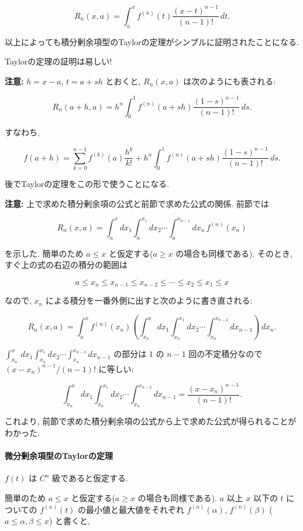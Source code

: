 \documentclass[10pt, a4paper,xelatex,ja=standard]{bxjsarticle}
\begin{document}
\[
R_n(x,a) = \int_a^x f^{(n)}(t)\frac{(x-t)^{n-1}}{(n-1)!}\,dt.
\]

以上によっても積分剰余項型のTaylorの定理がシンプルに証明されたことになる.

Taylorの定理の証明は易しい!

\textbf{注意:} \(h = x - a\), \(t = a + sh\) とおくと, \(R_n(x,a)\)
は次のようにも表される:

\[
R_n(a+h, a) = h^n\int_0^1 f^{(n)}(a + sh)\frac{(1-s)^{n-1}}{(n-1)!}\,ds.
\]

すなわち,

\[
f(a+h) =
\sum_{k=0}^{n-1} f^{(k)}(a)\frac{h^k}{k!} +
h^n\int_0^1 f^{(n)}(a + sh)\frac{(1-s)^{n-1}}{(n-1)!}\,ds.
\]

後でTaylorの定理をこの形で使うことになる.

\textbf{注意:} 上で求めた積分剰余項の公式と前節で求めた公式の関係.
前節では

\[
R_n(x, a) = \int_a^x dx_1\int_a^{x_1}dx_2\cdots\int_a^{x_{n-1}}dx_n\, f^{(n)}(x_n)
\]

を示した. 簡単のため \(a\le x\) と仮定する(\(a \ge x\)
の場合も同様である). そのとき, すぐ上の式の右辺の積分の範囲は

\[
a \le x_n \le x_{n-1}\le x_{n-2}\le\cdots\le x_2 \le x_1 \le x
\]

なので, \(x_n\) による積分を一番外側に出すと次のように書き直される:

\[
R_n(x, a) =
\int_a^x f^{(n)}(x_n)
\left(
\int_{x_n}^x\,dx_1\int_{x_n}^{x_1}dx_2\cdots\int_{x_n}^{x_{n-2}}dx_{n-1}
\right)\,dx_n.
\]

\(\int_{x_n}^x\,dx_1\int_{x_n}^{x_1}dx_2\cdots\int_{x_n}^{x_{n-2}}dx_{n-1}\)
の部分は \(1\) の \(n-1\) 回の不定積分なので \((x-x_n)^{n-1}/(n-1)!\)
に等しい:

\[
\int_{x_n}^x\,dx_1\int_{x_n}^{x_1}dx_2\cdots\int_{x_n}^{x_{n-2}}dx_{n-1} =
\frac{(x-x_n)^{n-1}}{(n-1)!}.
\]

これより,
前節で求めた積分剰余項の公式から上で求めた公式が得られることがわかった.

    \hypertarget{ux5faeux5206ux5270ux4f59ux9805ux578bux306etaylorux306eux5b9aux7406}{%
\paragraph{微分剰余項型のTaylorの定理}\label{ux5faeux5206ux5270ux4f59ux9805ux578bux306etaylorux306eux5b9aux7406}}

\(f(t)\) は \(C^n\) 級であると仮定する.

簡単のため \(a\le x\) と仮定する(\(a\ge x\) の場合も同様である). \(a\)
以上 \(x\) 以下の \(t\) についての \(f^{(n)}(t)\)
の最小値と最大値をそれぞれ \(f^{(n)}(\alpha)\), \(f^{(n)}(\beta)\)
(\(a\le\alpha,\beta\le x\)) と書くと,
\end{document}
